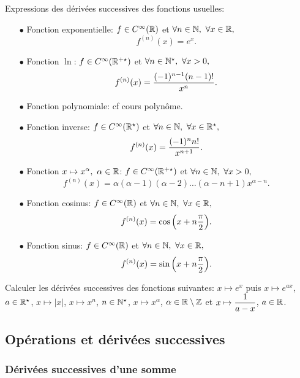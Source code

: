 \documentclass[a4paper, 11pt]{article}
\begin{document}
\begin{dboxminipage}{15cm}
	Expressions des d\'eriv\'ees successives des fonctions usuelles:
	\begin{itemize}
		\item[$\bullet$] Fonction exponentielle: $f\in C^{\infty}(\mathbb{R})$ et $\forall n\in\N,\ \forall x\in\R,$
		      $$f^{(n)}(x)=e^x.$$
		\item[$\bullet$] Fonction $\ln{}$: $f\in C^{\infty}(\mathbb{R}^{+\star})$ et $\forall n\in\mathbb{N}^{\star},\ \forall x>0,$ $$ f^{(n)}(x)=\displaystyle\frac{(-1)^{n-1} (n-1)!}{x^n}.$$
		\item[$\bullet$] Fonction polynomiale: cf cours polyn\^{o}me.
		\item[$\bullet$] Fonction inverse: $f\in C^{\infty}(\mathbb{R}^{\star})$ et $\forall n\in\mathbb{N},\ \forall x\in\mathbb{R}^{\star},$ $$ f^{(n)}(x)=\displaystyle\frac{(-1)^{n} n!}{x^{n+1}}.$$
		\item[$\bullet$] Fonction $x\mapsto x^{\alpha},\ \alpha\in\R$: $f\in C^{\infty}(\mathbb{R}^{+\star})$ et $\forall n\in\mathbb{N},\ \forall x>0,$  $$f^{(n)}(x)=\alpha(\alpha-1)(\alpha-2)\dots (\alpha-n+1)x^{\alpha-n}.$$
		\item[$\bullet$] Fonction cosinus: $f\in C^{\infty}(\mathbb{R})$ et $\forall n\in\N,\ \forall x\in\R,$ $$f^{(n)}(x)=\cos{\left( x+n\displaystyle\frac{\pi}{2}\right)}.$$
		\item[$\bullet$] Fonction sinus: $f\in C^{\infty}(\mathbb{R})$ et $\forall n\in\N,\ \forall x\in\R,$ $$f^{(n)}(x)=\sin{\left( x+n\displaystyle\frac{\pi}{2}\right)}.$$
	\end{itemize}
\end{dboxminipage}


{\footnotesize
\begin{exercice}
	Calculer les d\'eriv\'ees successives des fonctions suivantes: $x\mapsto e^x$ puis $x\mapsto e^{ax}$, $a\in\mathbb{R}^{\star}$, $x\mapsto |x|$, $x\mapsto x^n$, $n\in\mathbb{N}^{\star}$, $x\mapsto x^{\alpha}$, $\alpha\in\mathbb{R}\setminus\mathbb{Z}$ et $x\mapsto \displaystyle\frac{1}{a-x}$, $a\in\mathbb{R}$.
\end{exercice}}\vsec\vsec
\subsection{Op\'erations et d\'eriv\'ees successives}

\subsubsection{D\'eriv\'ees successives d'une somme}
\end{document}
